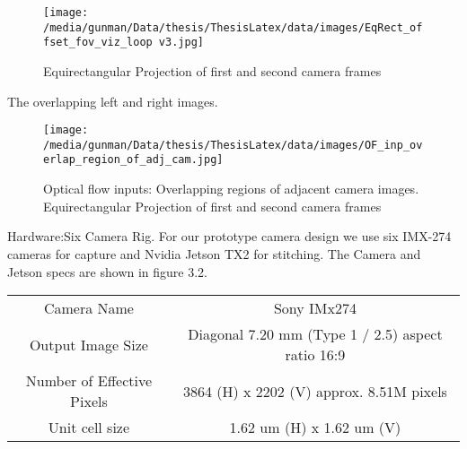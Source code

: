 \begin{figure*}
	\begin{center}
		\texttt{[image: /media/gunman/Data/thesis/ThesisLatex/data/images/EqRect\_offset\_fov\_viz\_loop v3.jpg]}
		\caption{Equirectangular Projection of first and second camera frames}
		\label{ODS_Input_Ouput}
	\end{center}
	\vspace{-0.3in}
\end{figure*} 

The overlapping left and right images.
\begin{figure*}
	\begin{center}
		\texttt{[image: /media/gunman/Data/thesis/ThesisLatex/data/images/OF\_inp\_overlap\_region\_of\_adj\_cam.jpg]}
		\caption{Optical flow inputs: Overlapping regions of adjacent camera images. Equirectangular Projection of first and second camera frames}
		\label{ODS_Input_Ouput}
	\end{center}
	\vspace{-0.3in}
\end{figure*} 

Hardware:Six Camera Rig. For our prototype camera design we use six IMX-274 cameras for capture and Nvidia Jetson TX2 for stitching. The Camera and Jetson specs are shown in figure 3.2. \newline 

\begin{tabular}{c|c}
	Camera Name & Sony IMx274 \\
	Output Image Size & Diagonal 7.20 mm (Type 1 / 2.5) aspect ratio 16:9 \\
	Number of Effective Pixels & 3864 (H) x 2202 (V) approx. 8.51M pixels \\
	Unit cell size & 1.62 um (H) x 1.62 um (V) \\
\end{tabular} \newline

